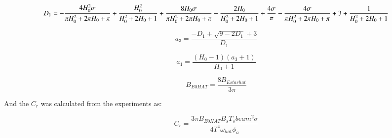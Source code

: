             
    
    \begin{equation}
D_{1} = - \frac{4 H_{0}^{2} \sigma}{\pi H_{0}^{2} \\ + 2 \pi H_{0} \\ + \pi} \\ + \frac{H_{0}^{2}}{H_{0}^{2} \\ + 2 H_{0} \\ + 1} \\ + \frac{8 H_{0} \sigma}{\pi H_{0}^{2} \\ + 2 \pi H_{0} \\ + \pi} - \frac{2 H_{0}}{H_{0}^{2} \\ + 2 H_{0} \\ + 1} \\ + \frac{4 \sigma}{\pi} - \frac{4 \sigma}{\pi H_{0}^{2} \\ + 2 \pi H_{0} \\ + \pi} \\ + 3 \\ + \frac{1}{H_{0}^{2} \\ + 2 H_{0} \\ + 1}
\label{eq:equation}
\end{equation}

    
 
            
    
    \begin{equation}
a_{3} = \frac{- D_{1} + \sqrt{9 - 2 D_{1}} + 3}{D_{1}}
\label{eq:equation}
\end{equation}

    
 
            
    
    \begin{equation}
a_{1} = \frac{\left(H_{0} - 1\right) \left(a_{3} + 1\right)}{H_{0} + 1}
\label{eq:equation}
\end{equation}

    
 
            
    
    \begin{equation}
B_{E0 HAT} = \frac{8 B_{E star hat}}{3 \pi}
\label{eq:equation}
\end{equation}

    

    And the \(C_r\) was calculated from the experiments as:
 
            
    
    \begin{equation}
C_{r} = \frac{3 \pi B_{E0 HAT} B_{s} T_{s} beam^{2} \sigma}{4 T^{4} \omega_{hat} \phi_{a}}
\label{eq:equation}
\end{equation}

